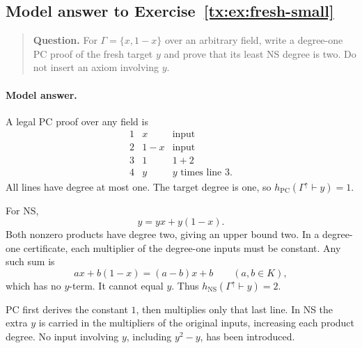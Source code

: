 \documentclass[11pt,a4paper,oneside,openany]{book}
\theoremstyle{definition}\newtheorem{definition}[theorem]{Definition}
\theoremstyle{remark}\newtheorem{remark}[theorem]{Remark}
\newcommand{\NS}{\mathrm{NS}}\newcommand{\PC}{\mathrm{PC}}
\numberwithin{equation}{chapter}
\begin{document}
\par


\begin{samepage}

\subsection*{Model answer to Exercise~\ref{tx:ex:fresh-small}}\label{tx:ans:fresh-small}

\begin{quote}\small\textbf{Question.} For $\Gamma=\{x,1-x\}$ over an arbitrary field, write a degree-one PC
proof of the fresh target $y$ and prove that its least NS degree is two.
Do not insert an axiom involving $y$.
\end{quote}

\paragraph{Model answer.}
A legal PC proof over any field is
\[
 \begin{array}{c|l|l}
 1&x&\text{input}\\
 2&1-x&\text{input}\\
 3&1&1+2\\
 4&y&y\text{ times line }3.
 \end{array}
\]
All lines have degree at most one. The target degree is one, so
\(h_{\PC}(\Gamma^\uparrow\vdash y)=1\).
\end{samepage}

For NS,
\[
                            y=yx+y(1-x).
\]
Both nonzero products have degree two, giving an upper bound two.
In a degree-one certificate, each multiplier of the degree-one
inputs must be constant. Any such sum is
\[
                       ax+b(1-x)=(a-b)x+b
                       \qquad(a,b\in K),
\]
which has no \(y\)-term. It cannot equal \(y\).
Thus \(h_{\NS}(\Gamma^\uparrow\vdash y)=2\).

PC first derives the constant \(1\), then multiplies only that last
line. In NS the extra \(y\) is carried in the multipliers of the
original inputs, increasing each product degree. No input involving
\(y\), including \(y^2-y\), has been introduced.


\par
\end{document}

